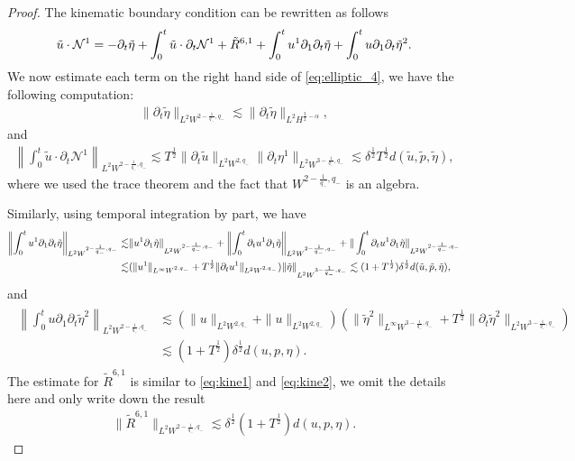 \documentclass[letterpaper,reqno,10pt,twoside]{amsart}
\theoremstyle{definition}
\theoremstyle{remark}
\def\p{\partial}
\begin{document}
\begin{proof}
			The kinematic boundary condition can be rewritten as follows
			\begin{align}{\label{eq:elliptic_4}}
				\tilde{u}\cdot \mathcal{N}^{1}=-\p_{t}\tilde{\eta}+\int_{0}^{t}\tilde{u}\cdot \p_{t}\mathcal{N}^{1}+\tilde{R}^{6,1}+\int_{0}^{t}u^{1}\p_{1}\p_{t}\tilde{\eta}+\int_{0}^{t}u\p_{1}\p_{t}\tilde{\eta}^{2}.
			\end{align}
			We now estimate each term on the right hand side of \eqref{eq:elliptic_4}, we have the following computation:
			\begin{align}
				\|\p_{t}\tilde{\eta}\|_{L^{2}W^{2-\frac{1}{q_{-}},q_{-}}}\lesssim \|\p_{t}\tilde{\eta}\|_{L^{2}H^{\frac{3}{2}-\alpha}},
			\end{align}
			\noindent and
			\begin{align}
				\left\|\int_{0}^{t}\tilde{u}\cdot \p_{t}\mathcal{N}^{1} \right\|_{L^{2}W^{2-\frac{1}{q_{-}},q_{-}}}\lesssim T^{\frac{1}{2}}\|\p_{t}\tilde{u}\|_{L^{2}W^{2,q_{-}}}\|\p_{t}\eta^{1}\|_{L^{2}W^{3-\frac{1}{q_{-}},q_{-}}}\lesssim \delta^{\frac{1}{2}}T^{\frac{1}{2}}d(\tilde{u},\tilde{p},\tilde{\eta}),
			\end{align}
			\noindent where we used the trace theorem and the fact that $W^{2-\frac{1}{q_{-}},q_{-}}$ is an algebra. 
			
			Similarly, using temporal integration by part, we have 
			\begin{align}
				\left\|\int_{0}^{t}u^{1}\p_{1}\p_{t}\tilde{\eta} \right\|_{L^{2}W^{2-\frac{1}{q_{-}},q_{-}}}\lesssim& \|u^{1}\p_{1}\tilde{\eta}\|_{L^{2}W^{2-\frac{1}{q_{-}},q_{-}}}+ \left\|\int_{0}^{t}\p_{t}u^{1}\p_{1}\tilde{\eta} \right\|_{L^{2}W^{2-\frac{1}{q_{-}},q_{-}}}+\|\int_{0}^{t}\p_{t}u^{1}\p_{1}\tilde{\eta}\|_{L^{2}W^{2-\frac{1}{q_{-}},q_{-}}}\notag\\
				\lesssim&(\|u^{1}\|_{L^{\infty}W^{2,q_{-}}}+T^{\frac{1}{2}}\|\p_{t}u^{1}\|_{L^{2}W^{2,q_{-}}})\|\tilde{\eta}\|_{L^{2}W^{3-\frac{1}{q_{-}},q_{-}}}\lesssim(1+T^{\frac{1}{2}})\delta^{\frac{1}{2}}d(\tilde{u},\tilde{p},\tilde{\eta})\label{eq:kine1},
			\end{align}
			\noindent and
			\begin{align}
				\begin{aligned}
					\left \|\int_{0}^{t}u\p_{1}\p_{t}\tilde{\eta}^{2} \right\|_{L^{2}W^{2-\frac{1}{q_{-}},q_{-}}}&\lesssim (\|u\|_{L^{2}W^{2,q_{-}}}+\|u\|_{L^{2}W^{2,q_{-}}})(\|\tilde{\eta}^{2}\|_{L^{\infty}W^{3-\frac{1}{q_{-}},q_{-}}}+T^{\frac{1}{2}}\|\p_{t}\tilde{\eta}^{2}\|_{L^{2}W^{3-\frac{1}{q_{-}},q_{-}}})\\
					&\lesssim(1+T^{\frac{1}{2}})\delta^{\frac{1}{2}}d({u},{p},{\eta})\label{eq:kine2}.
				\end{aligned}
			\end{align}
			The estimate for $\tilde{R}^{6,1}$ is similar to \eqref{eq:kine1} and \eqref{eq:kine2}, we omit the details here and only write down the result
			\begin{align}
				\|\tilde{R}^{6,1}\|_{L^{2}W^{2-\frac{1}{q_{-}},q_{-}}}\lesssim \delta^{\frac{1}{2}}(1+T^{\frac{1}{2}})d(u,p,\eta).
			\end{align}
			

\end{proof}
\end{document}
